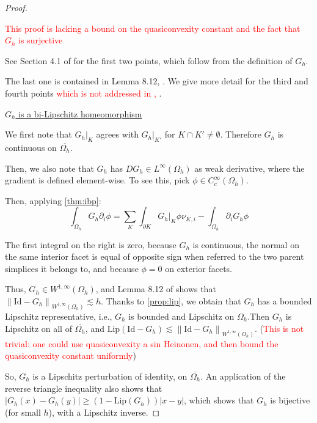 \documentclass[english,a4paper,10pt,oneside]{scrbook}	%
\theoremstyle{break}
\newenvironment{mproof}[1][\proofname]{%
  \begin{proof}[#1]$ $\par\nobreak\ignorespaces
}{%
  \end{proof}
}
\renewcommand*{\proofname}{Proof}
\theoremstyle{remark}
\newcommand{\norm}[1]{\left\lVert#1\right\rVert}
\newcommand{\id}{\text{Id}}
\begin{document}
\begin{mproof}

\textcolor{red}{This proof is lacking a bound on the quasiconvexity constant and the fact that $G_h$ is surjective}

See Section 4.1 of \cite{elliott} for the first two points, which follow from the definition of $G_h$.

The last one is contained in Lemma 8.12, \cite{ranner}. We give more detail for the third and fourth points \textcolor{red}{which is not addressed in \cite{ranner}, \cite{elliott}}.

\underline{$G_h$ is a bi-Lipschitz homeomorphism}

We first note that $G_h|_K$ agrees with $G_h|_{K'}$ for $K\cap K' \neq \emptyset$. Therefore $G_h$ is continuous on $\overline{\Omega_h}$.

Then, we also note that $G_h$ has $DG_h \in L^\infty(\Omega_h)$ as weak derivative, where the gradient is defined element-wise. To see this, pick $\phi \in C^\infty_c(\Omega_h)$.

Then, applying \cref{thm:ibp}:
$$\int_{\Omega_h} G_h \partial_i \phi = \sum_K \int_{\partial K}G_h|_{K} \phi \nu_{K,i}  - \int_{\Omega_h}\partial_i G_h \phi$$

The first integral on the right is zero, because $G_h$ is continuous, the normal on the same interior facet is equal of opposite sign when referred to the two parent simplices it belongs to, and because $\phi=0$ on exterior facets.

Thus, $G_h \in W^{1,\infty}(\Omega_h)$, and Lemma 8.12 of \cite{ranner} shows that $\norm{\id -G_h}_{W^{1,\infty}(\Omega_h)}\lesssim h$. Thanks to \cref{prop:lip}, we obtain that $G_h$ has a bounded Lipschitz representative, i.e., $G_h$ is bounded and Lipschitz on $\Omega_h$.Then $G_h$ is Lipschitz on all of $\overline{\Omega_h}$, and $\text{Lip}(\id -G_h) \lesssim  \norm{\id -G_h}_{W^{1,\infty}(\Omega_h)}$. (\textcolor{red}{This is not trivial: one could use quasiconvexity a sin Heinonen, and then bound the quasiconvexity constant uniformly})

So, $G_h$ is a Lipschitz perturbation of identity, on $\overline{\Omega_h}$.  An application of the reverse triangle inequality also shows that $|G_h(x)-G_h(y)|\geq (1-\text{Lip}(G_h))|x-y|$, which shows that $G_h$ is bijective (for small $h$), with a Lipschitz inverse.




\end{mproof}
\end{document}
